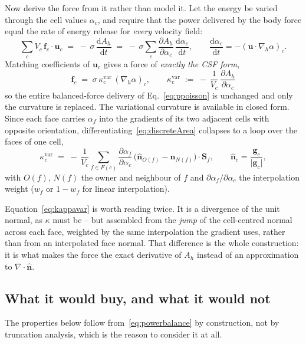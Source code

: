\documentclass[preprint,3p,11pt]{elsarticle}
\newcommand{\uvec}{\mathbf{u}}
\begin{document}
Now derive the force from it rather than model it. Let the energy be varied through the
cell values $\alpha_c$, and require that the power delivered by the body force equal the
rate of energy release for \emph{every} velocity field:
\begin{equation}
  \sum_c V_c\,\mathbf f_c\!\cdot\!\uvec_c \;=\; -\,\sigma\,\frac{\mathrm d A_h}{\mathrm dt}
  \;=\; -\,\sigma\sum_c \frac{\partial A_h}{\partial\alpha_c}\,\frac{\mathrm d\alpha_c}{\mathrm dt},
  \qquad
  \frac{\mathrm d\alpha_c}{\mathrm dt} = -(\uvec\!\cdot\!\nabla_{\!h}\alpha)_c .
  \label{eq:powerbalance}
\end{equation}
Matching coefficients of $\uvec_c$ gives a force of \emph{exactly the CSF form},
\begin{equation}
  \boxed{\;\mathbf f_c \;=\; \sigma\,\kappa^{\mathrm{var}}_c\,(\nabla_{\!h}\alpha)_c ,
  \qquad
  \kappa^{\mathrm{var}}_c \;:=\; -\,\frac{1}{V_c}\,\frac{\partial A_h}{\partial\alpha_c}\; }
  \label{eq:varforce}
\end{equation}
so the entire balanced-force delivery of Eq.~\eqref{eq:ppoisson} is unchanged and only the
curvature is replaced. The variational curvature is available in closed form. Since each
face carries $\alpha_f$ into the gradients of its two adjacent cells with opposite
orientation, differentiating~\eqref{eq:discreteArea} collapses to a loop over the faces of
one cell,
\begin{equation}
  \kappa^{\mathrm{var}}_c
  \;=\; -\,\frac{1}{V_c}\sum_{f\in F(c)}
        \frac{\partial\alpha_f}{\partial\alpha_c}\,
        \bigl(\hat{\mathbf n}_{O(f)}-\hat{\mathbf n}_{N(f)}\bigr)\!\cdot\!\mathbf S_f ,
  \qquad
  \hat{\mathbf n}_c=\frac{\mathbf g_c}{\lvert\mathbf g_c\rvert},
  \label{eq:kappavar}
\end{equation}
with $O(f)$, $N(f)$ the owner and neighbour of $f$ and $\partial\alpha_f/\partial\alpha_c$
the interpolation weight ($w_f$ or $1-w_f$ for linear interpolation).

Equation~\eqref{eq:kappavar} is worth reading twice. It is a divergence of the unit normal,
as $\kappa$ must be -- but assembled from the \emph{jump} of the cell-centred normal across
each face, weighted by the same interpolation the gradient uses, rather than from an
interpolated face normal. That difference is the whole construction: it is what makes the
force the exact derivative of $A_h$ instead of an approximation to $\nabla\!\cdot\!\hat{\mathbf n}$.

\subsection{What it would buy, and what it would not}
The properties below follow from~\eqref{eq:powerbalance} by construction, not by truncation
analysis, which is the reason to consider it at all.
\end{document}
